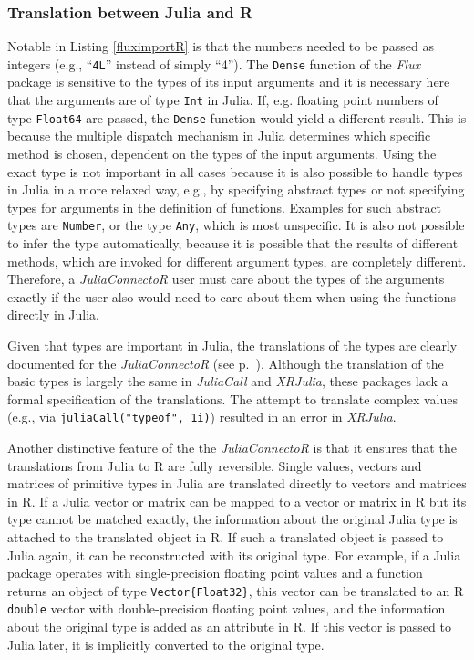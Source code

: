 \documentclass[12pt]{article}
\newcommand{\inlinecode}[1]{\texttt{#1}}
\newcommand{\apkg}[1]{\emph{#1}}
\begin{document}
\subsubsection{Translation between Julia and R}\label{translatejuliar}
Notable in Listing \ref{fluximportR} is that the numbers needed to be passed as integers (e.g., ``\inlinecode{4L}'' instead of simply ``4'').
The \inlinecode{Dense} function of the \apkg{Flux} package is sensitive to the types of its input arguments and it is necessary here that the arguments are of type \inlinecode{Int} in Julia.
If, e.g. floating point numbers of type \inlinecode{Float64} are passed, the \inlinecode{Dense} function would yield a different result.
This is because the multiple dispatch mechanism in Julia determines which specific method is chosen, dependent on the types of the input arguments.
Using the exact type is not important in all cases because it is also possible to handle types in Julia in a more relaxed way, e.g., by specifying abstract types or not specifying types for arguments in the definition of functions.
Examples for such abstract types are \inlinecode{Number}, or the type \inlinecode{Any}, which is most unspecific.
It is also not possible to infer the type automatically, because it is possible that the results of different methods, which are invoked for different argument types, are completely different.
Therefore, a \apkg{JuliaConnectoR} user must care about the types of the arguments exactly if the user also would need to care about them when using the functions directly in Julia.

Given that types are important in Julia, the translations of the types are clearly documented for the \apkg{JuliaConnectoR} (see p.~\pageref{juliaconnectordokutypetranslation}).
Although the translation of the basic types is largely the same in \apkg{JuliaCall} and \apkg{XRJulia}, these packages lack a formal specification of the translations.
The attempt to translate complex values (e.g., via \inlinecode{juliaCall("typeof", 1i)}) resulted in an error in \apkg{XRJulia}.

Another distinctive feature of the the \apkg{JuliaConnectoR} is that it ensures that the translations from Julia to R are fully reversible.
Single values, vectors and matrices of primitive types in Julia are translated directly to vectors and matrices in R.
If a Julia vector or matrix can be mapped to a vector or matrix in R but its type cannot be matched exactly, the information about the original Julia type is attached to the translated object in R.
If such a translated object is passed to Julia again, it can be reconstructed with its original type.
For example, if a Julia package operates with single-precision floating point values and a function returns an object of type \inlinecode{Vector\{Float32\}}, this vector can be translated to an R \inlinecode{double} vector with double-precision floating point values, and the information about the original type is added as an attribute in R.
If this vector is passed to Julia later, it is implicitly converted to the original type.
\end{document}

